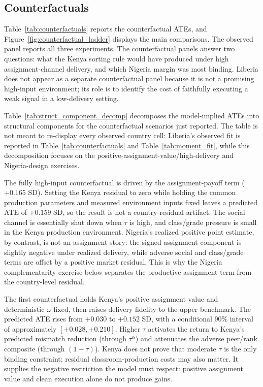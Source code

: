 \documentclass[11pt]{article}
\begin{document}
\subsection{Counterfactuals}
\label{subsec:struct_counterfactuals}

Table~\ref{tab:counterfactuals} reports the counterfactual ATEs, and Figure~\ref{fig:counterfactual_ladder} displays the main comparisons. The observed panel reports all three experiments. The counterfactual panels answer two questions: what the Kenya sorting rule would have produced under high assignment-channel delivery, and which Nigeria margin was most binding. Liberia does not appear as a separate counterfactual panel because it is not a promising high-input environment; its role is to identify the cost of faithfully executing a weak signal in a low-delivery setting.



Table~\ref{tab:struct_component_decomp} decomposes the model-implied ATEs into structural components for the counterfactual scenarios just reported. The table is not meant to re-display every observed country cell: Liberia's observed fit is reported in Table~\ref{tab:counterfactuals} and Table~\ref{tab:moment_fit}, while this decomposition focuses on the positive-assignment-value/high-delivery and Nigeria-design exercises.

The fully high-input counterfactual is driven by the assignment-payoff term ($+0.165$ SD). Setting the Kenya residual to zero while holding the common production parameters and measured environment inputs fixed leaves a predicted ATE of $+0.159$ SD, so the result is not a country-residual artifact. The social channel is essentially shut down when $\tau$ is high, and class/grade pressure is small in the Kenya production environment. Nigeria's realized positive point estimate, by contrast, is not an assignment story: the signed assignment component is slightly negative under realized delivery, while adverse social and class/grade terms are offset by a positive market residual. This is why the Nigeria complementarity exercise below separates the productive assignment term from the country-level residual.



The first counterfactual holds Kenya's positive assignment value and deterministic $\omega$ fixed, then raises delivery fidelity to the upper benchmark. The predicted ATE rises from $+0.030$ to $+0.152$ SD, with a conditional 90\% interval of approximately $[+0.028,+0.210]$. Higher $\tau$ activates the return to Kenya's predicted mismatch reduction (through $\tau^\alpha$) and attenuates the adverse peer/rank composite (through $(1-\tau)$). Kenya does not prove that moderate $\tau$ is the only binding constraint; residual classroom-production costs may also matter. It supplies the negative restriction the model must respect: positive assignment value and clean execution alone do not produce gains.
\end{document}
